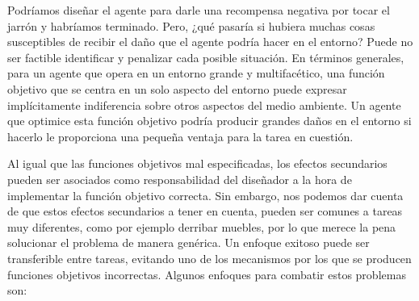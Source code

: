 \documentclass[12pt,a4paper]{article}
\begin{document}
Podríamos diseñar el agente para darle una recompensa negativa por tocar el jarrón y habríamos terminado. Pero, ¿qué pasaría si hubiera muchas cosas susceptibles de recibir el daño que el agente podría hacer en el entorno? Puede no ser factible identificar y penalizar cada posible situación. En términos generales, para un agente que opera en un entorno grande y multifacético, una función objetivo que se centra en un solo aspecto del entorno puede expresar implícitamente indiferencia sobre otros aspectos del medio ambiente. Un agente que optimice esta función objetivo podría producir grandes daños en el entorno si hacerlo le proporciona una pequeña ventaja para la tarea en cuestión.

Al igual que las funciones objetivos mal especificadas, los efectos secundarios pueden ser asociados como responsabilidad del diseñador a la hora de implementar la función objetivo correcta. Sin embargo, nos podemos dar cuenta de que estos efectos secundarios a tener en cuenta, pueden ser comunes a tareas muy diferentes, como por ejemplo derribar muebles, por lo que merece la pena solucionar el problema de manera genérica. Un enfoque exitoso puede ser transferible entre tareas, evitando uno de los mecanismos por los que se producen funciones objetivos incorrectas. Algunos enfoques para combatir estos problemas son:
\end{document}
